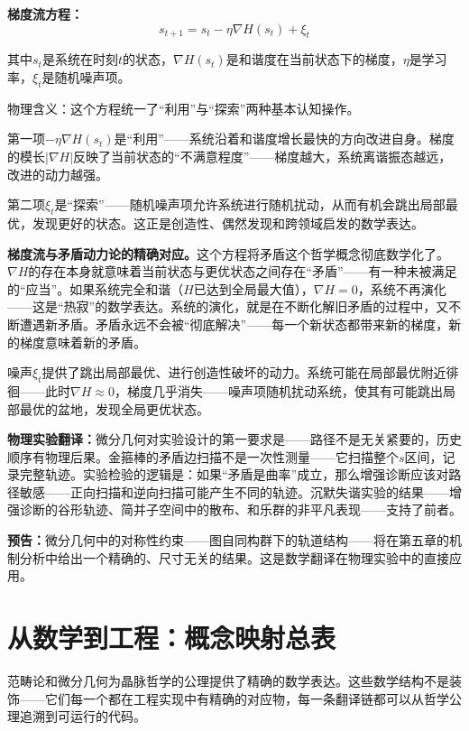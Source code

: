 \documentclass[11pt,a4paper]{book}
\theoremstyle{definition}
\begin{document}
\textbf{梯度流方程：}
\begin{equation}
s_{t+1} = s_t - \eta \nabla H(s_t) + \xi_t
\end{equation}

其中$s_t$是系统在时刻$t$的状态，$\nabla H(s_t)$是和谐度在当前状态下的梯度，$\eta$是学习率，$\xi_t$是随机噪声项。

物理含义：这个方程统一了“利用”与“探索”两种基本认知操作。

第一项$-\eta\nabla H(s_t)$是“利用”——系统沿着和谐度增长最快的方向改进自身。梯度的模长$|\nabla H|$反映了当前状态的“不满意程度”——梯度越大，系统离谐振态越远，改进的动力越强。

第二项$\xi_t$是“探索”——随机噪声项允许系统进行随机扰动，从而有机会跳出局部最优，发现更好的状态。这正是创造性、偶然发现和跨领域启发的数学表达。

\textbf{梯度流与矛盾动力论的精确对应。}这个方程将矛盾这个哲学概念彻底数学化了。$\nabla H$的存在本身就意味着当前状态与更优状态之间存在“矛盾”——有一种未被满足的“应当”。如果系统完全和谐（$H$已达到全局最大值），$\nabla H = 0$，系统不再演化——这是“热寂”的数学表达。系统的演化，就是在不断化解旧矛盾的过程中，又不断遭遇新矛盾。矛盾永远不会被“彻底解决”——每一个新状态都带来新的梯度，新的梯度意味着新的矛盾。

噪声$\xi_t$提供了跳出局部最优、进行创造性破坏的动力。系统可能在局部最优附近徘徊——此时$\nabla H \approx 0$，梯度几乎消失——噪声项随机扰动系统，使其有可能跳出局部最优的盆地，发现全局更优状态。

\textbf{物理实验翻译：}微分几何对实验设计的第一要求是——路径不是无关紧要的，历史顺序有物理后果。金箍棒的矛盾边扫描不是一次性测量——它扫描整个$s$区间，记录完整轨迹。实验检验的逻辑是：如果“矛盾是曲率”成立，那么增强诊断应该对路径敏感——正向扫描和逆向扫描可能产生不同的轨迹。沉默失谐实验的结果——增强诊断的谷形轨迹、简并子空间中的散布、和乐群的非平凡表现——支持了前者。

\textbf{预告：}微分几何中的对称性约束——图自同构群下的轨道结构——将在第五章的机制分析中给出一个精确的、尺寸无关的结果。这是数学翻译在物理实验中的直接应用。

\section{从数学到工程：概念映射总表}

范畴论和微分几何为晶脉哲学的公理提供了精确的数学表达。这些数学结构不是装饰——它们每一个都在工程实现中有精确的对应物，每一条翻译链都可以从哲学公理追溯到可运行的代码。
\end{document}
